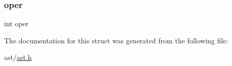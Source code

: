 \mbox{\label{structoperator_node_type_aded5bacd1ab04cf5d81f2007152472e1}} 
\subsubsection{\texorpdfstring{oper}{oper}}
{\footnotesize\ttfamily int oper}



The documentation for this struct was generated from the following file\+:\begin{DoxyCompactItemize}
\item 
ast/\hyperlink{ast_8h}{ast.\+h}\end{DoxyCompactItemize}
